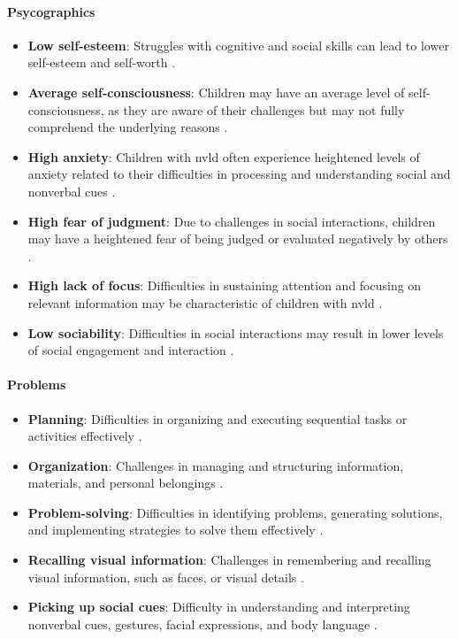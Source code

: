 \paragraph{Psycographics}
\begin{itemize}
    \item \textbf{Low self-esteem}: Struggles with cognitive and social skills can lead to lower self-esteem and self-worth \cite{understood_nvld_adult_2024}.
    \item \textbf{Average self-consciousness}: Children may have an average level of self-consciousness, as they are aware of their challenges but may not fully comprehend the underlying reasons \cite{understood_nvld_adult_2024}.
    \item \textbf{High anxiety}: Children with \gls{nvld} often experience heightened levels of anxiety related to their difficulties in processing and understanding social and nonverbal cues \cite{understood_nvld_adult_2024}.
    \item \textbf{High fear of judgment}: Due to challenges in social interactions, children may have a heightened fear of being judged or evaluated negatively by others \cite{understood_nvld_adult_2024}.
    \item \textbf{High lack of focus}: Difficulties in sustaining attention and focusing on relevant information may be characteristic of children with \gls{nvld} \cite{understood_nvld_2024}.
    \item \textbf{Low sociability}: Difficulties in social interactions may result in lower levels of social engagement and interaction \cite{understood_nvld_2024}.
\end{itemize}

\paragraph{Problems}
\begin{itemize}
    \item \textbf{Planning}: Difficulties in organizing and executing sequential tasks or activities effectively \cite{understood_nvld_adult_2024}.
    \item \textbf{Organization}: Challenges in managing and structuring information, materials, and personal belongings \cite{understood_nvld_adult_2024}.
    \item \textbf{Problem-solving}: Difficulties in identifying problems, generating solutions, and implementing strategies to solve them effectively \cite{jama_nvld_2024}.
    \item \textbf{Recalling visual information}: Challenges in remembering and recalling visual information, such as faces, or visual details \cite{understood_nvld_2024}.
    \item \textbf{Picking up social cues}: Difficulty in understanding and interpreting nonverbal cues, gestures, facial expressions, and body language \cite{nationalLibraryMedicine}.
\end{itemize}

